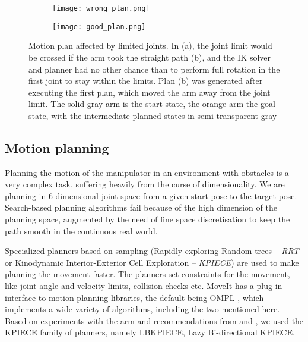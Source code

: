 \documentclass[buriama8_dp.tex]{subfiles}
\begin{document}
\begin{figure}[htp]
  \centering
  \begin{subfigure}[t]{0.49\textwidth}
    \texttt{[image: wrong\_plan.png]}
    \caption{}
    \label{fig:wrong_plan_joint}
  \end{subfigure}
  \begin{subfigure}[t]{0.49\textwidth}
    \texttt{[image: good\_plan.png]}
    \caption{}
    \label{fig:good_plan_joint}
  \end{subfigure}

  \caption[Non-optimal motion plan]{Motion plan affected by limited joints. In (a), the joint limit would be crossed if the arm took the straight path (b), and the IK solver and planner had no other chance than to perform full rotation in the first joint to stay within the limits. Plan (b) was generated after executing the first plan, which moved the arm away from the joint limit. The solid gray arm is the start state, the orange arm the goal state, with the intermediate planned states in semi-transparent gray}
  \label{fig:wrong_joints}
\end{figure}

\subsection{Motion planning}
\label{subsec:motion_planning}

Planning the motion of the manipulator in an environment with obstacles is a very complex task, suffering heavily from the curse of dimensionality. We are planning in 6-dimensional joint space from a given start pose to the target pose. Search-based planning algorithms fail because of the high dimension of the planning space, augmented by the need of fine space discretisation to keep the path smooth in the continuous real world.

Specialized planners based on sampling (Rapidly-exploring Random trees -- \emph{RRT} \cite{rrt}  or Kinodynamic Interior-Exterior Cell Exploration -- \emph{KPIECE}) are used to make planning the movement faster. The planners set constraints for the movement, like joint angle and velocity limits, collision checks etc. MoveIt has a plug-in interface to motion planning libraries, the default being OMPL \cite{ompl}, which implements a wide variety of algorithms, including the two mentioned here. Based on experiments with the arm and recommendations from \cite{vojta} and \cite{ompl}, we used the KPIECE family of planners, namely LBKPIECE, Lazy Bi-directional KPIECE.
\end{document}
